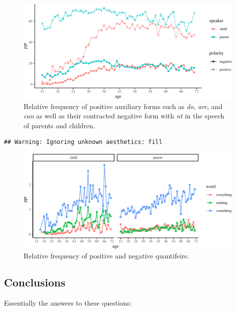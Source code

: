 \documentclass[man,floatsintext,draftall]{apa6}
\begin{document}
\begin{figure}
\centering
\includegraphics{negation_production_files/figure-latex/auxRelFreq-1.pdf}
\caption{\label{fig:auxRelFreq}Relative frequency of positive auxiliary forms such as \emph{do}, \emph{are}, and \emph{can} as well as their contracted negative form with \emph{nt} in the speech of parents and children.}
\end{figure}

\begin{verbatim}
## Warning: Ignoring unknown aesthetics: fill
\end{verbatim}

\begin{figure}
\centering
\includegraphics{negation_production_files/figure-latex/quantifiers-1.pdf}
\caption{\label{fig:quantifiers}Relative frequency of positive and negative quantifeirs.}
\end{figure}

\hypertarget{conclusions}{%
\subsection{Conclusions}\label{conclusions}}

Essentially the answers to these questions:
\end{document}
